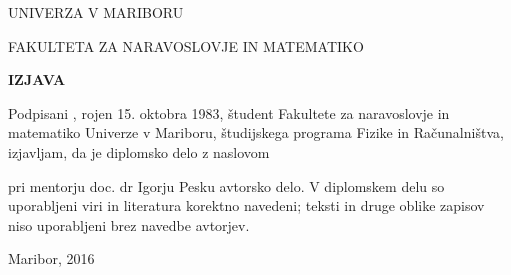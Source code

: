   \newpage

  \begin{center}
    \large
    UNIVERZA V MARIBORU

    FAKULTETA ZA NARAVOSLOVJE IN MATEMATIKO

  \end{center}

  \vspace{2cm}

  \begin{center}
    \Large
    \textbf{IZJAVA}
  \end{center}

  \vspace{2cm}

  Podpisani \kandidat, rojen 15. oktobra 1983, študent
  Fakultete za naravoslovje in matematiko Univerze v Mariboru,
  študijskega programa Fizike in Računalništva, izjavljam, da je
  diplomsko delo z naslovom
  \begin{center}
    \textbf{\podnaslov}
  \end{center}
  pri mentorju doc. dr Igorju Pesku avtorsko delo. V diplomskem delu so
  uporabljeni viri in literatura korektno navedeni; teksti in druge
  oblike zapisov niso uporabljeni brez navedbe avtorjev.

  \vspace{3cm}
  
  Maribor, 2016
  
  \vspace{1cm}  
  \hfill
  \begin{minipage}[t]{0.3\textwidth}
    \kandidat\\
     
  \end{minipage}
  



